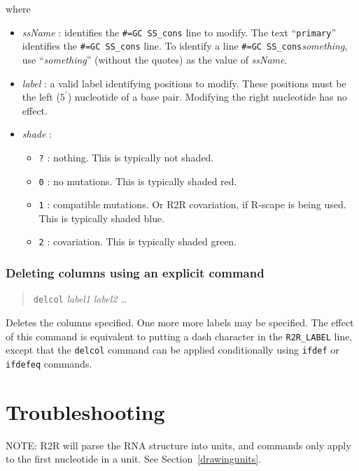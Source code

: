 \documentclass[letterpaper,12pt]{report}
\newcommand{\example}[1]{
\begin{quote}
{\raggedright
#1
}
\end{quote}
}
\begin{document}
where
\begin{itemize}
\item {\it ssName} : identifies the {\tt \#=GC SS\_cons} line to modify.  The text ``{\tt primary}'' identifies the {\tt \#=GC SS\_cons} line.  To identify a line {\tt \#=GC SS\_cons}{\it something}, use ``{\it something}'' (without the quotes) as the value of {\it ssName}.
\item {\it label} : a valid label identifying positions to modify.  These positions must be the left ($5^\prime$) nucleotide of a base pair.  Modifying the right nucleotide has no effect.
\item {\it shade} :
  \begin{itemize}
  \item {\tt ?} : nothing.  This is typically not shaded.
\item {\tt 0} : no mutations.  This is typically shaded red.
\item {\tt 1} : compatible mutations.  Or R2R covariation, if R-scape is being used.  This is typically shaded blue.
\item {\tt 2} : covariation.  This is typically shaded green.
  \end{itemize}
\end{itemize}

\subsubsection{Deleting columns using an explicit command}
\example{
{\tt delcol} {\it label1} {\it label2} {\dots}
}

Deletes the columns specified.  One more more labels may be specified.
The effect of this command is equivalent to putting a dash character in the {\tt R2R\_LABEL} line, except that the 
{\tt delcol} command can be applied conditionally using {\tt ifdef} or {\tt ifdefeq} commands.

\section{Troubleshooting}

NOTE: R2R will parse the RNA structure into units, and commands only
apply to the first nucleotide in a unit.  
See Section~\ref{drawingunits}.
\end{document}
